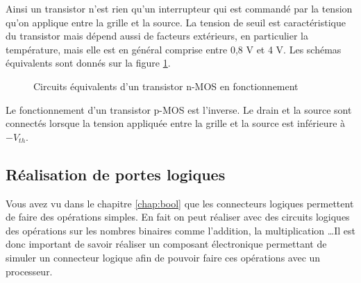 Ainsi un transistor n'est rien qu'un interrupteur qui est commandé par la tension qu'on applique entre la grille et la source. La tension de seuil est caractéristique du transistor mais dépend aussi de facteurs extérieurs, en particulier la température, mais elle est en général comprise entre 0,8 V et 4 V. Les schémas équivalents sont donnés sur la figure \ref{fig:trans2}.
\begin{figure}[ht]
  \centering
  \caption{\footnotesize{Circuits équivalents d'un transistor n-MOS en fonctionnement}}
  \label{fig:trans2}
\end{figure}
\par Le fonctionnement d'un transistor p-MOS est l'inverse. Le drain et la source sont connectés lorsque la tension appliquée entre la grille et la source est inférieure à $-V_{th}$.
\subsection{Réalisation de portes logiques}
Vous avez vu dans le chapitre \ref{chap:bool} que les connecteurs logiques permettent de faire des opérations simples. En fait on peut réaliser avec des circuits logiques des opérations sur les nombres binaires comme l'addition, la multiplication \dots Il est donc important de savoir réaliser un composant électronique permettant de simuler un connecteur logique afin de pouvoir faire ces opérations avec un processeur.
